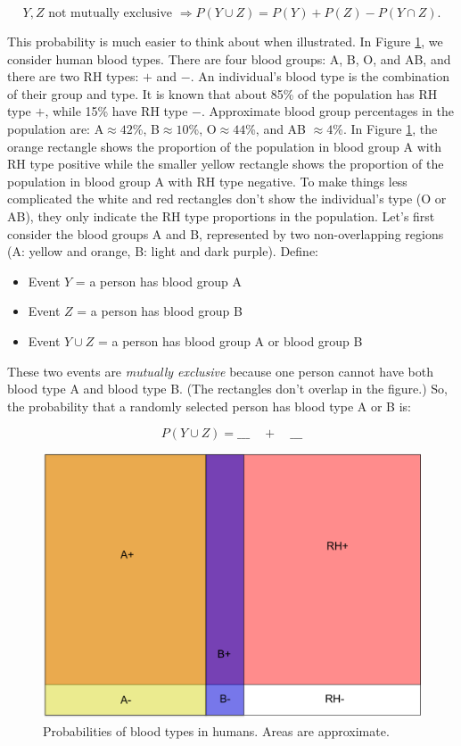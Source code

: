 \documentclass[]{book}
\providecommand{\tightlist}{%
  \setlength{\itemsep}{0pt}\setlength{\parskip}{0pt}}
\theoremstyle{definition}
\theoremstyle{definition}
\theoremstyle{remark}
\begin{document}
\[ Y,Z \text{ not mutually exclusive } \Rightarrow P(Y \cup Z) = P(Y) + P(Z) - P(Y \cap Z).\]

This probability is much easier to think about when illustrated. In
Figure \ref{fig:bloodvendiag}, we consider human blood types. There are
four blood groups: A, B, O, and AB, and there are two RH types: \(+\)
and \(-\). An individual's blood type is the combination of their group
and type. It is known that about 85\% of the population has RH type
\(+\), while 15\% have RH type \(-\). Approximate blood group
percentages in the population are: A\(\approx 42\)\%, B\(\approx 10\)\%,
O\(\approx 44\)\%, and AB \(\approx 4\)\%. In Figure
\ref{fig:bloodvendiag}, the orange rectangle shows the proportion of the
population in blood group A with RH type positive while the smaller
yellow rectangle shows the proportion of the population in blood group A
with RH type negative. To make things less complicated the white and red
rectangles don't show the individual's type (O or AB), they only
indicate the RH type proportions in the population. Let's first consider
the blood groups A and B, represented by two non-overlapping regions (A:
yellow and orange, B: light and dark purple). Define:

\begin{itemize}
\tightlist
\item
  Event \(Y\) = a person has blood group A
\item
  Event \(Z\) = a person has blood group B
\item
  Event \(Y \cup Z\) = a person has blood group A or blood group B
\end{itemize}

These two events are \emph{mutually exclusive} because one person cannot
have both blood type A and blood type B. (The rectangles don't overlap
in the figure.) So, the probability that a randomly selected person has
blood type A or B is:

\[ P(Y \cup Z) = \_\_\_ \quad + \quad \_\_\_\]

\begin{figure}[h]

{\centering \includegraphics[width=.5\linewidth]{img/bloodvenndiag} 

}

\caption{Probabilities of blood types in humans. Areas are approximate.}\label{fig:bloodvendiag}
\end{figure}
\end{document}
